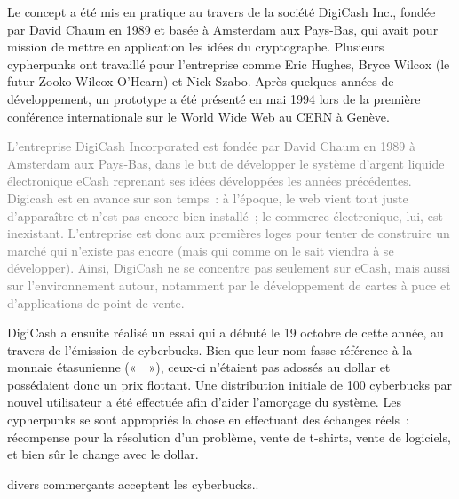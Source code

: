Le concept a été mis en pratique au travers de la société DigiCash Inc., fondée par David Chaum en 1989 et basée à Amsterdam aux Pays-Bas, qui avait pour mission de mettre en application les idées du cryptographe. Plusieurs cypherpunks ont travaillé pour l'entreprise comme Eric Hughes, Bryce Wilcox (le futur Zooko Wilcox-O'Hearn) et Nick Szabo. Après quelques années de développement, un prototype a été présenté en mai 1994 lors de la première conférence internationale sur le World Wide Web au CERN à Genève.

\textcolor{gray}{L'entreprise DigiCash Incorporated est fondée par David Chaum en 1989 à Amsterdam aux Pays-Bas, dans le but de développer le système d'argent liquide électronique eCash reprenant ses idées développées les années précédentes. Digicash est en avance sur son temps~: à l'époque, le web vient tout juste d'apparaître et n'est pas encore bien installé~; le commerce électronique, lui, est inexistant. L'entreprise est donc aux premières loges pour tenter de construire un marché qui n'existe pas encore (mais qui comme on le sait viendra à se développer). Ainsi, DigiCash ne se concentre pas seulement sur eCash, mais aussi sur l'environnement autour, notamment par le développement de cartes à puce et d'applications de point de vente.}


DigiCash a ensuite réalisé un essai qui a débuté le 19 octobre de cette année, au travers de l'émission de cyberbucks. Bien que leur nom fasse référence à la monnaie étasunienne («~~»), ceux-ci n'étaient pas adossés au dollar et possédaient donc un prix flottant. Une distribution initiale de 100 cyberbucks par nouvel utilisateur a été effectuée afin d'aider l'amorçage du système. Les cypherpunks se sont appropriés la chose en effectuant des échanges réels~: récompense pour la résolution d'un problème, vente de t-shirts, vente de logiciels, et bien sûr le change avec le dollar.

divers commerçants acceptent les cyberbucks..

